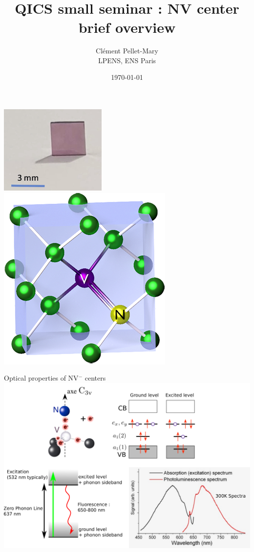 \documentclass{beamer}
\title{QICS small seminar : NV center brief overview}
\author{Clément Pellet-Mary\\ LPENS, ENS Paris}
\date\today
\begin{document}
\begin{frame}
\maketitle
\centering
\includegraphics[scale=.5]{diamant_alex}
\includegraphics[scale=.2]{Nitrogen-vacancy_center}
\end{frame}
\begin{frame}{Optical properties of NV$^-$ centers}
\centering
\includegraphics[width=\textwidth,height=0.9\textheight,keepaspectratio]{slide_NV_optical}
\end{frame}
\end{document}
